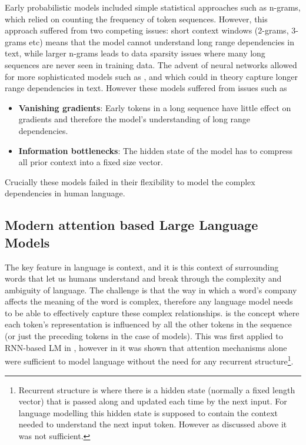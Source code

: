 Early probabilistic models included simple statistical approaches such as n-grams, which relied on counting the frequency of token sequences. However, this approach suffered from two competing issues: short context windows (2-grams, 3-grams etc) means that the model cannot understand long range dependencies in text, while larger n-grams leads to data sparsity issues where many long sequences are never seen in training data. The advent of neural networks allowed for more sophisticated models such as  \cite{bengioNeuralProbabilisticLanguage2003},  \cite{tomasmikolavSTATISTICALLANGUAGEMODELS} and  \cite{merityRegularizingOptimizingLSTM2017} which could in theory capture longer range dependencies in text. However these models suffered from issues such as
\begin{itemize}
    \item \textbf{Vanishing gradients}: Early tokens in a long sequence have little effect on gradients and therefore the model's understanding of long range dependencies.
    \item \textbf{Information bottlenecks}: The hidden state of the model has to compress all prior context into a fixed size vector.
\end{itemize}
Crucially these models failed in their flexibility to model the complex dependencies in human language.

\subsection{Modern attention based Large Language Models}

The key feature in language is context, and it is this context of surrounding words that let us humans understand and break through the complexity and ambiguity of language. The challenge is that the way in which a word's company affects the meaning of the word is complex, therefore any language model needs to be able to effectively capture these complex relationships.  is the concept where each token's representation is influenced by all the other tokens in the sequence (or just the preceding tokens in the case of  models). This was first applied to RNN-based LM in \cite{bahdanauNeuralMachineTranslation2016}, however in \cite{vaswaniAttentionAllYou2017} it was shown that attention mechanisms alone were sufficient to model language without the need for any recurrent structure\footnote{Recurrent structure is where there is a hidden state (normally a fixed length vector) that is passed along and updated each time by the next input. For language modelling this hidden state is supposed to contain the context needed to understand the next input token. However as discussed above it was not sufficient.}.

